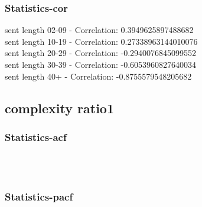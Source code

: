 \documentclass{article}%
\begin{document}
%
\newpage%
\subsubsection{Statistics{-}cor}%
\label{ssubsec:Statistics{-}cor}%
\noindent%
sent length 02-09 - Correlation: 0.3949625897488682\\%
sent length 10-19 - Correlation: 0.27338963144010076\\%
sent length 20-29 - Correlation: -0.2940076845099552\\%
sent length 30-39 - Correlation: -0.6053960827640034\\%
sent length 40+ - Correlation: -0.8755579548205682\\

%
\newpage

%
\subsection{complexity ratio1}%
\label{subsec:complexityratio1}%
\subsubsection{Statistics{-}acf}%
\label{ssubsec:Statistics{-}acf}%


\begin{figure}[ht]%
\centering%
\setlength{\abovecaptionskip}{-35pt}%
%
%
\\%
%
%
\\%
%
\end{figure}

%
\newpage%
\subsubsection{Statistics{-}pacf}%
\label{ssubsec:Statistics{-}pacf}%
\end{document}
